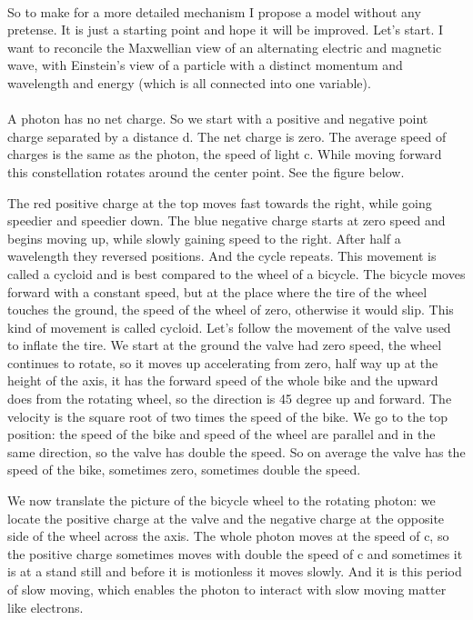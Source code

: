 \paragraph{}
So to make for a more detailed mechanism I propose a model without any pretense. It is just a starting point and hope it will be improved. Let's start. 
I want to reconcile the Maxwellian view of an alternating electric and magnetic wave, with Einstein's view of a particle with a distinct momentum and wavelength and energy (which is all connected into one variable). 
\paragraph{}
A photon has no net charge. So we start with a positive and negative point charge separated by a distance d. The net charge is zero. The average speed of charges is the same as the photon, the speed of light c. While moving forward this constellation rotates around the center point. See the figure below.

The red positive charge at the top moves fast towards the right, while going speedier and speedier down. The blue negative charge starts at zero speed and begins moving up, while slowly gaining speed to the right. After half a wavelength they reversed positions. And the cycle repeats.
This movement is called a cycloid and is best compared to the wheel of a bicycle. The bicycle moves forward with a constant speed, but at the place where the tire of the wheel touches the ground, the speed of the wheel of zero, otherwise it would slip. This kind of movement is called cycloid.
Let's follow the movement of the valve used to inflate the tire.
We start at the ground the valve had zero speed, the wheel continues to rotate, so it moves up accelerating from zero, half way up at the height of the axis, it has the forward speed of the whole bike and the upward does from the rotating wheel, so the direction is 45 degree up and forward. The velocity is the square root of two times the speed of the bike. We go to the top position: the speed of the bike and speed of the wheel are parallel and in the same direction, so the valve has double the speed.
So on average the valve has the speed of the bike, sometimes zero, sometimes double the speed.

We now translate the picture of the bicycle wheel to the rotating photon: we locate the positive charge at the valve and the negative charge at the opposite side of the wheel across the axis. The whole photon moves at the speed of c, so the positive charge sometimes moves with double the speed of c and sometimes it is at a stand still and before it is motionless it moves slowly. And it is this period of slow moving, which enables the photon to interact with slow moving matter like electrons.

